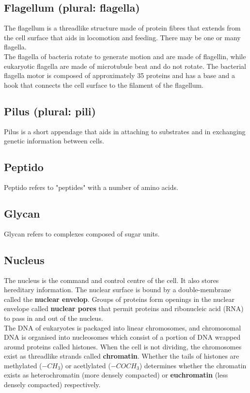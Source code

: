 \documentclass[11pt]{article}
\begin{document}
\subsection{Flagellum (plural: flagella)}
\label{sec:orga92b2f2}
The flagellum is a threadlike structure made of protein fibres that extends from the cell surface that aids in locomotion and feeding. There may be one or many flagella.
\\[0pt]

The flagella of bacteria rotate to generate motion and are made of flagellin, while eukaryotic flagella are made of microtubule beat and do not rotate. The bacterial flagella motor is composed of approximately 35 proteins and has a base and a hook that connects the cell surface to the filament of the flagellum.

\subsection{Pilus (plural: pili)}
\label{sec:org0792a3a}
Pilus is a short appendage that aids in attaching to substrates and in exchanging genetic information between cells.

\subsection{Peptido}
\label{sec:org455c9b5}
Peptido refers to "peptides" with a number of amino acids.

\subsection{Glycan}
\label{sec:org070b5c5}
Glycan refers to complexes composed of sugar units.

\subsection{Nucleus}
\label{sec:org4f97920}
The nucleus is the command and control centre of the cell. It also stores hereditary information. The nuclear surface is bound by a double-membrane called the \textbf{nuclear envelop}. Groups of proteins form openings in the nuclear envelope called \textbf{nuclear pores} that permit proteins and ribonucleic acid (RNA) to pass in and out of the nucleus.
\\[0pt]

The DNA of eukaryotes is packaged into linear chromosomes, and chromosomal DNA is organised into nucleosomes which consist of a portion of DNA wrapped around proteins called histones. When the cell is not dividing, the chromosomes exist as threadlike strands called \textbf{chromatin}. Whether the tails of histones are methylated (\(-CH_3\)) or acetlylated (\(-COCH_3\)) determines whether the chromatin exists as heterochromatin (more densely compacted) or \textbf{euchromatin} (less densely compacted) respectively.
\end{document}
